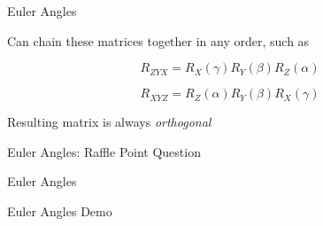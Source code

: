 \documentclass{beamer}
\begin{document}
\begin{frame}{Euler Angles}

Can chain these matrices together in any order, such as

\[ R_{ZYX} = R_X(\gamma) R_Y(\beta) R_Z(\alpha) \]

\[ R_{XYZ} = R_Z(\alpha) R_Y(\beta) R_X(\gamma)  \]

Resulting matrix is always \em{orthogonal}

\end{frame}

\begin{frame}{Euler Angles: Raffle Point Question}




\end{frame}

\begin{frame}{Euler Angles}

Euler Angles Demo

\end{frame}




\end{document}
